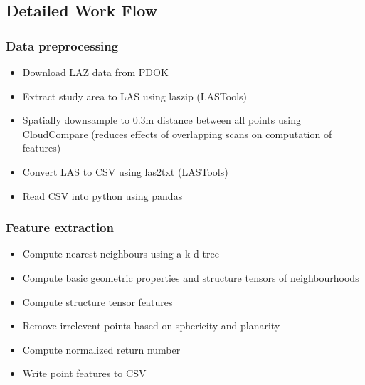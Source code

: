 \pagebreak
\subsection{Detailed Work Flow}
\subsubsection{Data preprocessing}
	\begin{itemize}
		\item Download LAZ data from PDOK
		\item Extract study area to LAS using laszip (LASTools)
		\item Spatially downsample to 0.3m distance between all points using CloudCompare (reduces effects of overlapping scans on computation of features)
		\item Convert LAS to CSV using las2txt (LASTools)
		\item Read CSV into python using pandas
	\end{itemize}

\subsubsection{Feature extraction}
	\begin{itemize}
		\item Compute nearest neighbours using a k-d tree
		\item Compute basic geometric properties and structure tensors of neighbourhoods
		\item Compute structure tensor features
		\item Remove irrelevent points based on sphericity and planarity
		\item Compute normalized return number
		\item Write point features to CSV
	\end{itemize}

